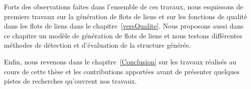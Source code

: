 Forts des observations faites dans l'ensemble de ces travaux, nous esquissons de premiers travaux sur la génération de flots de liens et sur les fonctions de qualité dans les flots de liens dans le chapitre~\ref{versQualite}.
Nous proposons aussi dans ce chapitre un modèle de génération de flots de liens et nous testons différentes méthodes de détection et d'évaluation de la structure générée.


Enfin, nous revenons dans le chapitre~\ref{Conclusion} sur les travaux réalisés au cours de cette thèse et les contributions apportées avant de présenter quelques pistes de recherches qu'ouvrent nos travaux.